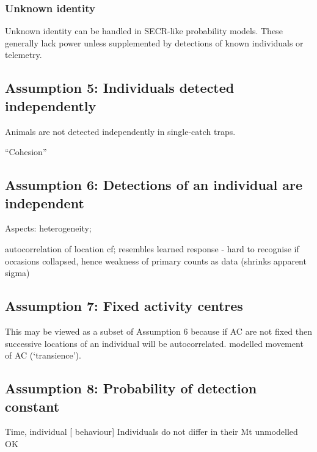 \documentclass[
]{book}
\begin{document}
\subsubsection{Unknown identity}\label{unknown-identity}

Unknown identity can be handled in SECR-like probability models. These generally lack power unless supplemented by detections of known individuals or telemetry.

\citet{cr13}

\citet{rcr15}

\citet{vanDamBates2024}

\subsection{Assumption 5: Individuals detected independently}\label{assumption-5-individuals-detected-independently}

Animals are not detected independently in single-catch traps.

``Cohesion'' \citet{Bischof2020}

\subsection{Assumption 6: Detections of an individual are independent}\label{assumption-6-detections-of-an-individual-are-independent}

Aspects: heterogeneity;

autocorrelation of location cf;
resembles learned response - hard to recognise if occasions collapsed, hence weakness of primary counts as data (shrinks apparent sigma)

\subsection{Assumption 7: Fixed activity centres}\label{assumption-7-fixed-activity-centres}

This may be viewed as a subset of Assumption 6 because if AC are not fixed then successive locations of an individual will be autocorrelated. \citet{Royle2015} modelled movement of AC (`transience').

\subsection{Assumption 8: Probability of detection constant}\label{assumption-8-probability-of-detection-constant}

Time, individual {[} behaviour{]}
Individuals do not differ in their
\citet{Sollmann2024} Mt unmodelled OK
\end{document}
